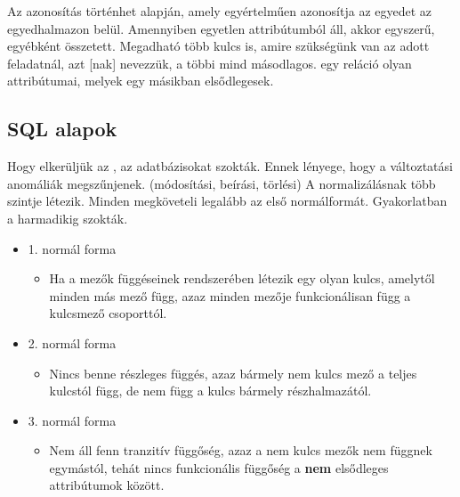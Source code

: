 \documentclass[../../main.tex]{subfiles}
\begin{document}
Az azonosítás történhet  alapján, amely egyértelműen
azonosítja az egyedet az egyedhalmazon belül. Amennyiben egyetlen
attribútumból áll, akkor egyszerű, egyébként összetett.
Megadható több kulcs is, amire szükségünk van az adott feladatnál,
azt [nak] nevezzük, a többi mind másodlagos.
 egy reláció olyan attribútumai,
melyek egy másikban elsődlegesek.

\subsection{SQL alapok}

Hogy elkerüljük az , az adatbázisokat
 szokták. Ennek lényege, hogy a
változtatási anomáliák megszűnjenek. (módosítási, beírási,
törlési) A normalizálásnak több szintje létezik.
Minden  megköveteli legalább
az első normálformát. Gyakorlatban a harmadikig szokták.
\begin{itemize}
	\item {1. normál forma}
	      \begin{itemize}
		      \item Ha a mezők függéseinek rendszerében
		            létezik egy olyan kulcs, amelytől minden
		            más mező függ, azaz minden mezője
		            funkcionálisan függ a kulcsmező csoporttól.
	      \end{itemize}

	\item {2. normál forma}
	      \begin{itemize}
		      \item Nincs benne részleges függés, azaz bármely nem
		            kulcs mező a teljes kulcstól függ, de nem függ a
		            kulcs bármely részhalmazától.
	      \end{itemize}

	\item {3. normál forma}
	      \begin{itemize}
		      \item Nem áll fenn tranzitív függőség, azaz
		            a nem kulcs mezők nem függnek egymástól,
		            tehát nincs funkcionális függőség a \textbf{nem}
		            elsődleges attribútumok között.
	      \end{itemize}
\end{itemize}
\end{document}
